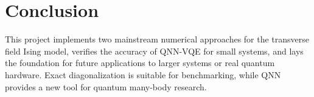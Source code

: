 \section{Conclusion}
This project implements two mainstream numerical approaches for the transverse field Ising model, verifies the accuracy of QNN-VQE for small systems, and lays the foundation for future applications to larger systems or real quantum hardware. Exact diagonalization is suitable for benchmarking, while QNN provides a new tool for quantum many-body research.




